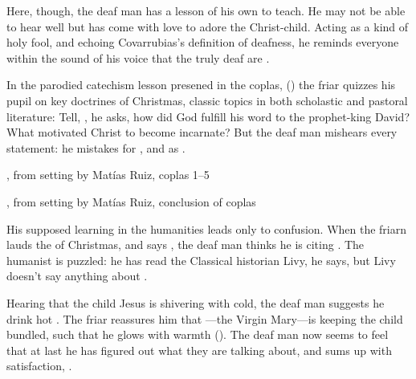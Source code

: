 Here, though, the deaf man has a lesson of his own to teach.
He may not be able to hear well but has come with love to adore the Christ-child. 
Acting as a kind of holy fool, and echoing Covarrubias's definition of deafness, he reminds everyone within the sound of his voice that the truly deaf are .

In the parodied catechism lesson presened in the coplas, () the friar quizzes his pupil on key doctrines of Christmas, classic topics in both scholastic and pastoral literature:
Tell, , he asks, how did God fulfill his word to the prophet-king David?
What motivated Christ to become incarnate?
But the deaf man mishears every statement: he mistakes  for , and  as .

\begin{expoem}
  \caption{, from setting by Matías Ruiz, coplas 1--5}
  \label{expoem:Pues_la_fiesta-Ruiz-coplas-1}
\end{expoem}

\begin{expoem}
  \caption{, from setting by Matías Ruiz, conclusion of coplas}
  \label{expoem:Pues_la_fiesta-Ruiz-coplas-2}
\end{expoem}

His supposed learning in the humanities leads only to confusion.
When the friarn lauds the  of Christmas, and says , the deaf man thinks he is citing .
The humanist is puzzled: he has read the Classical historian Livy, he says, but Livy doesn't say anything about .

Hearing that the child Jesus is shivering with cold, the deaf man suggests he drink hot .
The friar reassures him that ---the Virgin Mary---is keeping the child bundled, such that he glows with warmth ().
The deaf man now seems to feel that at last he has figured out what they are talking about, and sums up with satisfaction, .

